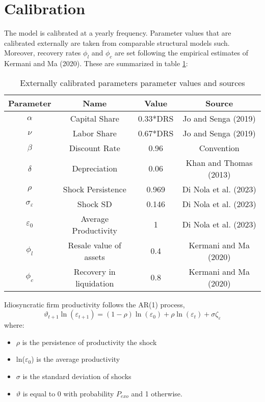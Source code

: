 \documentclass[12pt]{article}
\begin{document}
\section{Calibration}

The model is calibrated at a yearly frequency. Parameter values that are calibrated externally are taken from comparable structural models such. Moreover, recovery rates $\phi_l$ and $\phi_c$ are set following the empirical estimates of Kermani and Ma (2020). These are summarized in table \ref{tab:external calib}: 

\begin{table}[h!]
    \centering
    \begin{tabular}{c|c|c|c}
    \toprule
    \textbf{Parameter} & \textbf{Name} & \textbf{Value} & \textbf{Source} \\
    \midrule
    $\alpha$ & Capital Share & 0.33*DRS & Jo and Senga (2019) \\
    $\nu$ & Labor Share & 0.67*DRS & Jo and Senga (2019) \\
    $\beta$ & Discount Rate & 0.96 & Convention \\
    $\delta$ & Depreciation & 0.06 & Khan and Thomas (2013) \\
    $\rho$ & Shock Persistence & 0.969 & Di Nola et al. (2023) \\
    $\sigma_{\varepsilon}$ & Shock SD & 0.146 & Di Nola et al. (2023)  \\
    $\varepsilon_0$ & Average Productivity & 1 & Di Nola et al. (2023)  \\
    $\phi_l$ & Resale value of assets & 0.4 & Kermani and Ma (2020) \\ 
    $\phi_c$ & Recovery in liquidation & 0.8 & Kermani and Ma (2020) \\    
    \bottomrule
    \end{tabular}
    \caption{Externally calibrated parameters parameter values and sources}
    \label{tab:external calib}
\end{table}
\noindent Idiosyncratic firm productivity follows the AR(1) process,
$$ \vartheta_{t+1} \ln(\varepsilon_{t+1}) = (1-\rho) \ln(\varepsilon_0) + \rho \ln(\varepsilon_t) + \sigma \zeta_\varepsilon $$
where: 
\begin{itemize}\setlength\itemsep{0em} \small
    \item $\rho$ is the persistence of productivity the shock
    \item ln($\varepsilon_0$) is the average productivity
    \item $\sigma$ is the standard deviation of shocks
    \item $\vartheta$ is equal to 0 with probability $P_{exo}$ and 1 otherwise.
\end{itemize} \normalsize
\end{document}
